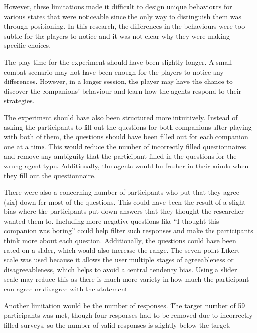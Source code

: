 \documentclass{IEEEtran}
\begin{document}
However, these limitations made it difficult to design unique behaviours for various states that were noticeable since the only way to distinguish them was through positioning. In this research, the differences in the behaviours were too subtle for the players to notice and it was not clear why they were making specific choices.

The play time for the experiment should have been slightly longer. A small combat scenario may not have been enough for the players to notice any differences. However, in a longer session, the player may have the chance to discover the companions’ behaviour and learn how the agents respond to their strategies.

The experiment should have also been structured more intuitively. Instead of asking the participants to fill out the questions for both companions after playing with both of them, the questions should have been filled out for each companion one at a time. This would reduce the number of incorrectly filled questionnaires and remove any ambiguity that the participant filled in the questions for the wrong agent type. Additionally, the agents would be fresher in their minds when they fill out the questionnaire.

There were also a concerning number of participants who put that they agree (six) down for most of the questions. This could have been the result of a slight bias where the participants put down answers that they thought the researcher wanted them to. Including more negative questions like “I thought this companion was boring” could help filter such responses and make the participants think more about each question. Additionally, the questions could have been rated on a slider, which would also increase the range. The seven-point Likert scale was used because it allows the user multiple stages of agreeableness or disagreeableness, which helps to avoid a central tendency bias. Using a slider scale may reduce this as there is much more variety in how much the participant can agree or disagree with the statement.

Another limitation would be the number of responses. The target number of 59 participants was met, though four responses had to be removed due to incorrectly filled surveys, so the number of valid responses is slightly below the target.

\end{document}

